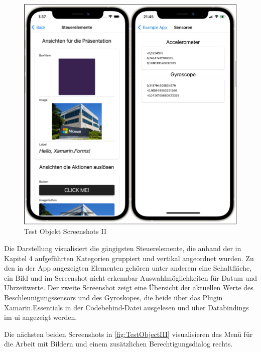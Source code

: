 \begin{figure}[!ht]
 \includegraphics[width=\textwidth,keepaspectratio]{Images/Screenshot/Sensors.png}
 \caption{Test Objekt Screenshots II}
 \label{fig:TestObjectII}
\end{figure}
Die Darstellung visualisiert die gängigsten Steuerelemente,  die anhand der in Kapitel 4 aufgeführten Kategorien gruppiert und vertikal angeordnet wurden.  Zu den in der App angezeigten Elementen gehören unter anderem eine Schaltfläche,  ein Bild und im Screenshot nicht erkennbar Auswahlmöglichkeiten für Datum und Uhrzeitwerte.  Der zweite Screenshot zeigt eine Übersicht der aktuellen Werte des Beschleunigungssensors und des Gyroskopes,  die beide über das Plugin Xamarin.Essentials in der Codebehind-Datei ausgelesen und über Databindings im \ac{ui} angezeigt werden.    

Die nächsten beiden Screenshots in \ref{fig:TestObjectIII} visualisieren das Menü für die Arbeit mit Bildern und einem zusätzlichen Berechtigungsdialog rechts.

